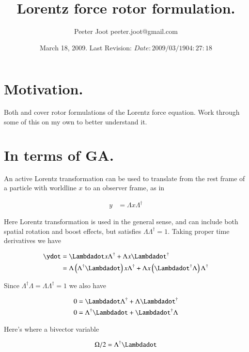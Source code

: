 \documentclass{article}
\title{ Lorentz force rotor formulation. }
\author{Peeter Joot \quad peeter.joot@gmail.com }
\date{ March 18, 2009.  Last Revision: $Date: 2009/03/19 04:27:18 $ }
\begin{document}
\maketitle{}
\tableofcontents

\section{ Motivation. }

Both \cite{baylis-2007} and \cite{doran2003gap} cover rotor formulations
of the Lorentz force equation.  Work through some of this on my own to 
better understand it.

\section{ In terms of GA. }

An active Lorentz transformation can be used to translate from the rest frame of a particle with worldline $x$ to 
an observer frame, as in

\begin{align}
y &= \Lambda x \Lambda^\dagger
\end{align}

Here Lorentz transformation is used in the general sense, and can include both spatial rotation and boost effects, but satisfies $\Lambda\Lambda^\dagger = 1$.  Taking proper time derivatives we have

\begin{align*}
\ydot 
&= \Lambdadot x \Lambda^\dagger + \Lambda x \Lambdadot^\dagger \\
&= \Lambda \left(\Lambda^\dagger \Lambdadot\right) x \Lambda^\dagger + \Lambda x \left(\Lambdadot^\dagger \Lambda \right) \Lambda^\dagger \\
\end{align*}

Since $\Lambda^\dagger\Lambda = \Lambda\Lambda^\dagger = 1$ we also have

\begin{align*}
0 &= \Lambdadot\Lambda^\dagger + \Lambda\Lambdadot^\dagger  \\
0 &= \Lambda^\dagger\Lambdadot + \Lambdadot^\dagger\Lambda
\end{align*}

Here's where a bivector variable 

\begin{align}
\Omega/2 = \Lambda^\dagger \Lambdadot
\end{align}
\end{document}
